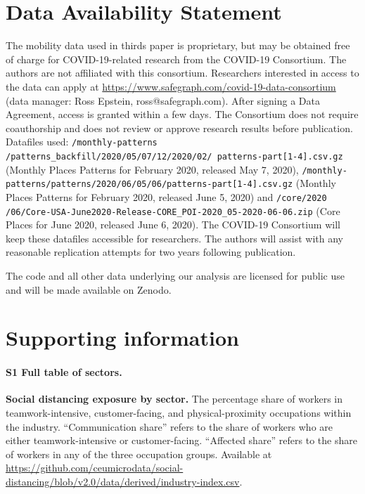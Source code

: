 \section*{Data Availability Statement}
The mobility data used in thirds paper \cite{SafeGraph2020-gn} is proprietary, but may be obtained free of charge for COVID-19-related research from the COVID-19 Consortium. The authors are not affiliated with this consortium. Researchers interested in access to the data can apply at \url{https://www.safegraph.com/covid-19-data-consortium} (data manager: Ross Epstein, ross@safegraph.com). After signing a Data Agreement, access is granted within a few days. The Consortium does not require coauthorship and does not review or approve research results before publication. Datafiles used: \texttt{/monthly-patterns /patterns\_backfill/2020/05/07/12/2020/02/ patterns-part[1-4].csv.gz} (Monthly Places Patterns for February 2020, released May 7, 2020), \texttt{/monthly-patterns/patterns/2020/06/05/06/patterns-part[1-4].csv.gz} (Monthly Places Patterns for February 2020, released June 5, 2020) and \texttt{/core/2020 /06/Core-USA-June2020-Release-CORE\_POI-2020\_05-2020-06-06.zip} (Core Places for June 2020, released June 6, 2020). The COVID-19 Consortium will keep these datafiles accessible for researchers. The authors will assist with any reasonable replication attempts for two years following publication.

The code and all other data underlying our analysis are licensed for public use and will be made available on Zenodo. 

\section*{Supporting information}

\paragraph*{S1 Full table of sectors.}
\label{S1_File}
{\bf Social distancing exposure by sector.} The percentage share of workers in teamwork-intensive, customer-facing, and physical-proximity occupations within the industry. ``Communication share'' refers to the share of workers who are either teamwork-intensive or customer-facing. ``Affected share'' refers to the share of workers in any of the three occupation groups. Available at \url{https://github.com/ceumicrodata/social-distancing/blob/v2.0/data/derived/industry-index.csv}.

